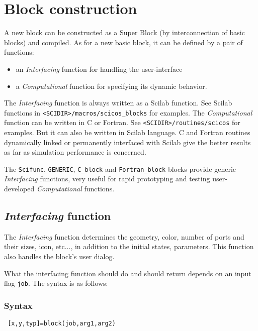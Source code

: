 \documentclass{article}
\newcommand{\computational}{{\em Computational }}
\newcommand{\interfacing}{{\em Interfacing }}
\begin{document}
\section{Block construction}
A new block can be constructed as a Super Block (by interconnection of basic
blocks) and compiled. As for a new basic block, it can be 
defined by a pair of functions: 
\begin{itemize}
\item an \interfacing function for handling the user-interface
\item a \computational function for specifying its dynamic behavior.
\end{itemize}
The \interfacing function is always written as a  Scilab function. See 
Scilab functions in {\tt <SCIDIR>/macros/scicos\_blocks}
for examples. The \computational function can be written in 
C or Fortran. See {\tt <SCIDIR>/routines/scicos} for examples.
But it can also be written in Scilab language. C and Fortran routines dynamically linked or
permanently interfaced with Scilab give the better results as far as  
simulation performance is concerned. 

The {\tt Scifunc}, {\tt GENERIC}, {\tt C\_block} and {\tt Fortran\_block} blocks provide
generic \interfacing functions, very useful for rapid prototyping and testing user-developed
\computational functions.


\subsection{\interfacing function}
The \interfacing function determines the geometry, color, number
of ports and their sizes, icon, etc..., in addition to the initial states,
parameters. This function also handles the block's user dialog.

What the interfacing function should do and should
return depends on an input flag {\tt job}. The syntax is as follows:

\subsubsection{Syntax}
\begin{verbatim}
 [x,y,typ]=block(job,arg1,arg2)
\end{verbatim}
\end{document}
